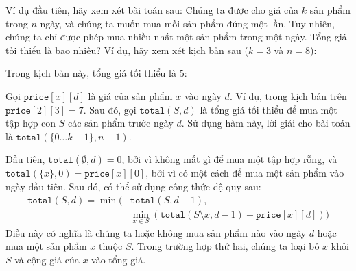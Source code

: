Ví dụ đầu tiên, hãy xem xét bài toán sau:
Chúng ta được cho giá của $k$ sản phẩm
trong $n$ ngày, và chúng ta muốn mua mỗi sản phẩm
đúng một lần.
Tuy nhiên, chúng ta chỉ được phép mua nhiều nhất một sản phẩm
trong một ngày.
Tổng giá tối thiểu là bao nhiêu?
Ví dụ, hãy xem xét kịch bản sau ($k=3$ và $n=8$):
\begin{center}
\end{center}
Trong kịch bản này, tổng giá tối thiểu là $5$:
\begin{center}
\end{center}

Gọi $\texttt{price}[x][d]$ là giá của sản phẩm $x$
vào ngày $d$.
Ví dụ, trong kịch bản trên $\texttt{price}[2][3] = 7$.
Sau đó, gọi $\texttt{total}(S,d)$ là tổng giá
tối thiểu để mua một tập hợp con $S$ các sản phẩm trước ngày $d$.
Sử dụng hàm này, lời giải cho bài toán là
$\texttt{total}(\{0 \ldots k-1\},n-1)$.

Đầu tiên, $\texttt{total}(\emptyset,d) = 0$,
bởi vì không mất gì để mua một tập hợp rỗng,
và $\texttt{total}(\{x\},0) = \texttt{price}[x][0]$,
bởi vì có một cách để mua một sản phẩm vào ngày đầu tiên.
Sau đó, có thể sử dụng công thức đệ quy sau:
\begin{equation*}
\begin{split}
\texttt{total}(S,d) = \min( & \texttt{total}(S,d-1), \\
& \min_{x \in S} (\texttt{total}(S \setminus x,d-1)+\texttt{price}[x][d]))
\end{split}
\end{equation*}
Điều này có nghĩa là chúng ta hoặc không mua sản phẩm nào vào ngày $d$
hoặc mua một sản phẩm $x$ thuộc $S$.
Trong trường hợp thứ hai, chúng ta loại bỏ $x$ khỏi $S$ và cộng
giá của $x$ vào tổng giá.

